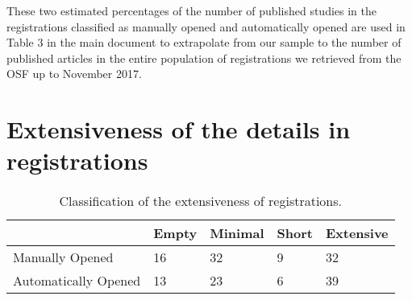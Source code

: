 \documentclass[
  ,jou, a4paper,floatsintext]{apa6}
\begin{document}
These two estimated percentages of the number of published studies in the registrations classified as manually opened and automatically opened are used in Table 3 in the main document to extrapolate from our sample to the number of published articles in the entire population of registrations we retrieved from the OSF up to November 2017.

\hypertarget{extensiveness-of-the-details-in-registrations}{%
\section{Extensiveness of the details in registrations}\label{extensiveness-of-the-details-in-registrations}}

\begin{table*}[tbp]

\begin{center}
\begin{threeparttable}

\caption{\label{tab:table-quality}Classification of the extensiveness of registrations.}

\begin{tabular}{lllll}
\toprule
 & \multicolumn{1}{c}{Empty} & \multicolumn{1}{c}{Minimal} & \multicolumn{1}{c}{Short} & \multicolumn{1}{c}{Extensive}\\
\midrule
Manually Opened & 16 & 32 & 9 & 32\\
Automatically Opened & 13 & 23 & 6 & 39\\
\bottomrule
\end{tabular}

\end{threeparttable}
\end{center}

\end{table*}
\end{document}
